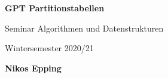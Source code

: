 \begin{frame}
    \begin{center}            
        \vspace{1.2cm}

        \Huge
        \textbf{GPT Partitionstabellen}

        \vspace{0.2cm}

        \large 
        Seminar Algorithmen und Datenstrukturen

        Wintersemester 2020/21

        \vspace{0.5cm}

        \Large
        \textbf{Nikos Epping}

        \vfill

        

    \end{center}
\end{frame}